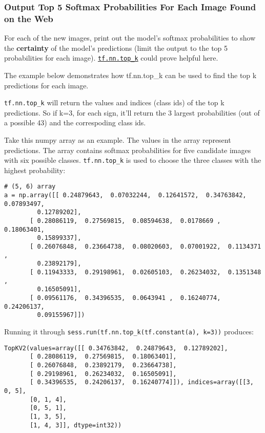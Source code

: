 \documentclass[11pt]{article}
\begin{document}
    \subsubsection{Output Top 5 Softmax Probabilities For Each Image Found
on the
Web}\label{output-top-5-softmax-probabilities-for-each-image-found-on-the-web}

    For each of the new images, print out the model's softmax probabilities
to show the \textbf{certainty} of the model's predictions (limit the
output to the top 5 probabilities for each image).
\href{https://www.tensorflow.org/versions/r0.12/api_docs/python/nn.html\#top_k}{\texttt{tf.nn.top\_k}}
could prove helpful here.

The example below demonstrates how tf.nn.top\_k can be used to find the
top k predictions for each image.

\texttt{tf.nn.top\_k} will return the values and indices (class ids) of
the top k predictions. So if k=3, for each sign, it'll return the 3
largest probabilities (out of a possible 43) and the correspoding class
ids.

Take this numpy array as an example. The values in the array represent
predictions. The array contains softmax probabilities for five candidate
images with six possible classes. \texttt{tf.nn.top\_k} is used to
choose the three classes with the highest probability:

\begin{verbatim}
# (5, 6) array
a = np.array([[ 0.24879643,  0.07032244,  0.12641572,  0.34763842,  0.07893497,
         0.12789202],
       [ 0.28086119,  0.27569815,  0.08594638,  0.0178669 ,  0.18063401,
         0.15899337],
       [ 0.26076848,  0.23664738,  0.08020603,  0.07001922,  0.1134371 ,
         0.23892179],
       [ 0.11943333,  0.29198961,  0.02605103,  0.26234032,  0.1351348 ,
         0.16505091],
       [ 0.09561176,  0.34396535,  0.0643941 ,  0.16240774,  0.24206137,
         0.09155967]])
\end{verbatim}

Running it through \texttt{sess.run(tf.nn.top\_k(tf.constant(a),\ k=3))}
produces:

\begin{verbatim}
TopKV2(values=array([[ 0.34763842,  0.24879643,  0.12789202],
       [ 0.28086119,  0.27569815,  0.18063401],
       [ 0.26076848,  0.23892179,  0.23664738],
       [ 0.29198961,  0.26234032,  0.16505091],
       [ 0.34396535,  0.24206137,  0.16240774]]), indices=array([[3, 0, 5],
       [0, 1, 4],
       [0, 5, 1],
       [1, 3, 5],
       [1, 4, 3]], dtype=int32))
\end{verbatim}
\end{document}
